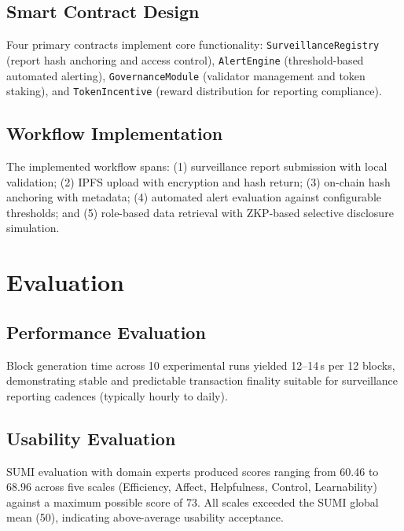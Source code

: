 \documentclass[AMA,LATO1COL]{WileyNJDv5}
\begin{document}
\subsection{Smart Contract Design}

Four primary contracts implement core functionality: \texttt{SurveillanceRegistry} (report hash anchoring and access control), \texttt{AlertEngine} (threshold-based automated alerting), \texttt{GovernanceModule} (validator management and token staking), and \texttt{TokenIncentive} (reward distribution for reporting compliance).

\subsection{Workflow Implementation}

The implemented workflow spans: (1) surveillance report submission with local validation; (2) IPFS upload with encryption and hash return; (3) on-chain hash anchoring with metadata; (4) automated alert evaluation against configurable thresholds; and (5) role-based data retrieval with ZKP-based selective disclosure simulation.

\section{Evaluation}\label{sec:evaluation}

\subsection{Performance Evaluation}

Block generation time across 10 experimental runs yielded 12--14\,s per 12 blocks, demonstrating stable and predictable transaction finality suitable for surveillance reporting cadences (typically hourly to daily).

\subsection{Usability Evaluation}

SUMI evaluation with domain experts produced scores ranging from 60.46 to 68.96 across five scales (Efficiency, Affect, Helpfulness, Control, Learnability) against a maximum possible score of 73. All scales exceeded the SUMI global mean (50), indicating above-average usability acceptance.
\end{document}
